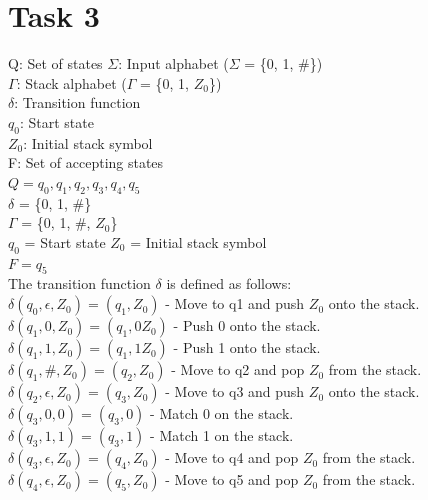 \chapter{Task 3}
Q: Set of states
$\Sigma$: Input alphabet ($\Sigma$ = \{0, 1, \#\})\\
$\Gamma$: Stack alphabet ($\Gamma$ = \{0, 1, $Z_0$\})\\
$\delta$: Transition function \\
$q_0$: Start state\\
$Z_0$: Initial stack symbol\\
F: Set of accepting states \\
%
$Q = {q_0, q_1, q_2, q_3, q_4, q_5}$ \\
$\delta$ = \{0, 1, \#\} \\
$\Gamma$ = \{0, 1, \#, $Z_0$\} \\
$q_0$ = Start state
$Z_0$ = Initial stack symbol \\
$F = {q_5}$ \\
%
The transition function $\delta$ is defined as follows: \\
%
    $\delta(q_0, \epsilon, Z_0) = (q_1, Z_0)$ - Move to q1 and push $Z_0$ onto the stack.\\
$\delta(q_1, 0, Z_0) = (q_1, 0Z_0)$ - Push 0 onto the stack.\\
$\delta(q_1, 1, Z_0) = (q_1, 1Z_0)$ - Push 1 onto the stack.\\
$\delta(q_1, \#, Z_0) = (q_2, Z_0)$ - Move to q2 and pop $Z_0$ from the stack.\\
$\delta(q_2, \epsilon, Z_0) = (q_3, Z_0)$ - Move to q3 and push $Z_0$ onto the stack.\\
$\delta(q_3, 0, 0) = (q_3, 0)$ - Match 0 on the stack.\\
$\delta(q_3, 1, 1) = (q_3, 1)$ - Match 1 on the stack.\\
$\delta(q_3, \epsilon, Z_0) = (q_4, Z_0)$ - Move to q4 and pop $Z_0$ from the stack.\\
$\delta(q_4, \epsilon, Z_0) = (q_5, Z_0)$ - Move to q5 and pop $Z_0$ from the stack.\\


